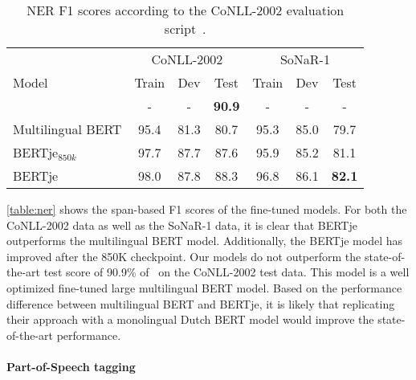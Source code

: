 \documentclass[11pt]{article}
\begin{document}
\begin{table}[t]
\begin{center}
  \begin{tabular}{l || c c c | c c c}
    \toprule
                   & \multicolumn{3}{c|}{CoNLL-2002} & \multicolumn{3}{c}{SoNaR-1}                                                   \\
    Model          & Train                           & Dev                       & Test           & Train & Dev   & Test           \\
    \midrule
    \citet{wu2019surprising} & - & - & \textbf{90.9}    & - & - & - \\
    \midrule
    Multilingual BERT          & 95.4                           & 81.3                     & 80.7          & 95.3 & 85.0 & 79.7          \\
BERTje$_{850k}$ & 97.7                           & 87.7                     & 87.6          & 95.9 & 85.2 & 81.1          \\
    BERTje         & 98.0                           & 87.8                     & 88.3 & 96.8 & 86.1 & \textbf{82.1} \\
    \bottomrule
  \end{tabular}
\end{center}
   \caption{\label{table:ner}NER F1 scores according to the CoNLL-2002 evaluation script~\citep{tjong2002conll}.}
\end{table}


\autoref{table:ner} shows the span-based F1 scores of the fine-tuned models.
For both the CoNLL-2002 data as well as the SoNaR-1 data, it is clear that BERTje outperforms the multilingual BERT model.
Additionally, the BERTje model has improved after the 850K checkpoint.
Our models do not outperform the state-of-the-art test score of 90.9\% of~\citet{wu2019surprising} on the CoNLL-2002 test data.
This model is a well optimized fine-tuned large multilingual BERT model.
Based on the performance difference between multilingual BERT and BERTje, it is likely that replicating their approach with a monolingual Dutch BERT model would improve the state-of-the-art performance.


\paragraph{Part-of-Speech tagging}
\end{document}
